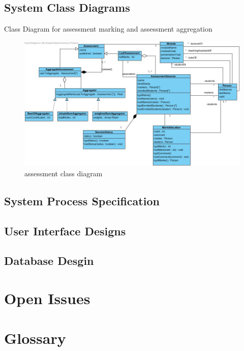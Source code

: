 \documentclass[12pt]{article}
\begin{document}
		\subsection{System Class Diagrams }%
		Class Diagram for assessment marking and assessment aggregation
		\begin{figure}[h]
\centering
\includegraphics{MiniPhase2ClassDiag.jpg}
\caption{assessment class diagram}
\end{figure}
						
				\vspace{0.2in}
		
		\subsection{System Process Specification}%
						
				\vspace{0.2in}
		
		\subsection{User Interface Designs} %
				\vspace{0.2in}
		
		\subsection{Database Desgin} %
						
				\vspace{0.2in}
			
			
	
	\section{Open Issues}
	
		\vspace{0.2in}
		
		
	\newpage
	\section{Glossary}
	
		\vspace{0.2in}
		
			
	
	
\end{document}
